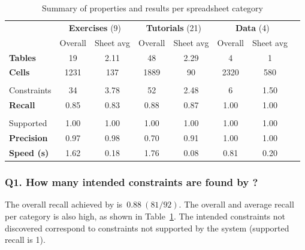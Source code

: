 {\setlength{\tabcolsep}{0.33em}
\begin{table}[]
  \centering
  \caption{Summary of properties and results per spreadsheet category}
  \label{tbl:category_overview}
  \begin{tabularx}{\linewidth}{lccccccc}
 & \multicolumn{2}{c}{\textbf{Exercises} (9)} & \multicolumn{2}{c}{\textbf{Tutorials} (21)} & \multicolumn{2}{c}{\textbf{Data} (4)} \\
 & Overall & Sheet avg & Overall & Sheet avg & Overall & Sheet avg \\ \hline
    \textbf{Tables} & 19 & 2.11 & 48 & 2.29 & 4 & 1 \\ \hline
    \textbf{Cells} & 1231 & 137 & 1889 & 90 & 2320 & 580 \\ \hline
    \textbf{\begin{tabular}[c]{@{}l@{}}Intended\\[-4.5pt] Constraints\end{tabular}} & 34 & 3.78 & 52 & 2.48 & 6 & 1.50 \\ \hline \hline
\textbf{Recall} & 0.85 & 0.83 & 0.88 & 0.87 & 1.00 & 1.00 \\ \hline
\textbf{\begin{tabular}[c]{@{}l@{}}Recall\\[-4.5pt] Supported\end{tabular}} & 1.00 & 1.00 & 1.00 & 1.00 & 1.00 & 1.00 \\ \hline
\textbf{Precision} & 0.97 & 0.98 & 0.70 & 0.91 & 1.00 & 1.00 \\ \hline
\textbf{Speed (s)} & 1.62 & 0.18 & 1.76 & 0.08 & 0.81 & 0.20
\end{tabularx}
\end{table}}

\subsubsection*{Q1. How many intended constraints are found by \sname?}
The overall recall achieved by \sname is~$0.88~(81/92)$. The overall and average recall per category is also high, as shown in Table~\ref{tbl:category_overview}.
The intended constraints not discovered correspond to constraints not supported by the system (supported recall is 1).





